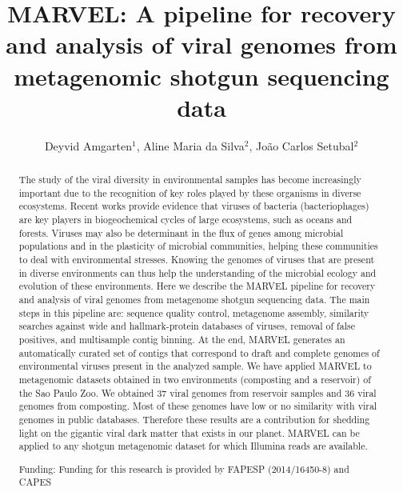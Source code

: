 \documentclass[twoside]{article}
\title{\vspace{-15mm}\fontsize{24pt}{10pt}\selectfont\textbf{MARVEL: A pipeline for recovery and analysis of viral genomes from metagenomic shotgun sequencing data}} %
\author{Deyvid Amgarten$^1$, Aline Maria da Silva$^2$, Jo\~ao Carlos Setubal$^2$}
\affil{1 USP - DEPARTAMENTO DE QUIMICA\\ 2 USP\\ }
\date{}
\begin{document}
\maketitle %

\thispagestyle{fancy} %


\begin{abstract}
The study of the viral diversity in environmental samples has become increasingly important due to the recognition of key roles played by these organisms in diverse ecosystems. Recent works provide evidence that viruses of bacteria (bacteriophages) are key players in biogeochemical cycles of large ecosystems, such as oceans and forests. Viruses may also be determinant in the flux of genes among microbial populations and in the plasticity of microbial communities, helping these communities to deal with environmental stresses. Knowing the genomes of viruses that are present in diverse environments can thus help the understanding of the microbial ecology and evolution of these environments. Here we describe the MARVEL pipeline for recovery and analysis of viral genomes from metagenome shotgun sequencing data. The main steps in this pipeline are: sequence quality control, metagenome assembly, similarity searches against wide and hallmark-protein databases of viruses, removal of false positives, and multisample contig binning. At the end, MARVEL generates an automatically curated set of contigs that correspond to draft and complete genomes of environmental viruses present in the analyzed sample. We have applied MARVEL to metagenomic datasets obtained in two environments (composting and a reservoir) of the Sao Paulo Zoo. We obtained 37 viral genomes from reservoir samples and 36 viral genomes from composting. Most of these genomes have low or no similarity with viral genomes in public databases. Therefore these results are a contribution for shedding light on the gigantic viral dark matter that exists in our planet. MARVEL can be applied to any shotgun metagenomic dataset for which Illumina reads are available.

Funding: Funding for this research is provided by FAPESP (2014/16450-8) and CAPES
\end{abstract}
\end{document}
